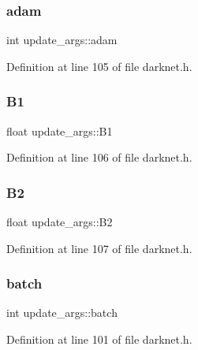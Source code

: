 \subsubsection{\texorpdfstring{adam}{adam}}
{\footnotesize\ttfamily int update\+\_\+args\+::adam}



Definition at line 105 of file darknet.\+h.

\mbox{\label{structupdate__args_a1822b0d844c349135590f3583415faec}} 
\subsubsection{\texorpdfstring{B1}{B1}}
{\footnotesize\ttfamily float update\+\_\+args\+::\+B1}



Definition at line 106 of file darknet.\+h.

\mbox{\label{structupdate__args_ad4542261082ee829820f2d6a750021f6}} 
\subsubsection{\texorpdfstring{B2}{B2}}
{\footnotesize\ttfamily float update\+\_\+args\+::\+B2}



Definition at line 107 of file darknet.\+h.

\mbox{\label{structupdate__args_a1accceb722234c5aa3f38cc85c1d7cf7}} 
\subsubsection{\texorpdfstring{batch}{batch}}
{\footnotesize\ttfamily int update\+\_\+args\+::batch}



Definition at line 101 of file darknet.\+h.

\mbox{\label{structupdate__args_a9eb5a4b5663dca4b69a13a19da674f19}} 
